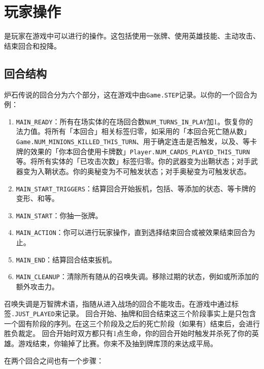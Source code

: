 \chapter{玩家操作}
\label{player-action}

是玩家在游戏中可以进行的操作。这包括使用一张牌、使用英雄技能、主动攻击、结束回合和投降。

\section{回合结构}
炉石传说的回合分为六个部分，这在游戏中由\texttt{Game.STEP}记录。以你的一个回合为例：
\begin{enumerate}
    \item {}\texttt{MAIN\_READY}：所有在场实体的在场回合数\texttt{NUM\_TURNS\_IN\_PLAY}加1。恢复你的法力值。将所有「本回合」相关标签归零，如采用的「本回合死亡随从数」\texttt{Game.NUM\_MINIONS\_KILLED\_THIS\_TURN}、用于确定连击是否触发，以及、等卡牌的效果的「你本回合使用卡牌数」\texttt{Player.NUM\_\allowbreak{}CARDS\_PLAYED\_THIS\_TURN}等。将所有实体的「已攻击次数」标签归零。你的武器变为出鞘状态；对手武器变为入鞘状态。你的奥秘变为不可触发状态；对手奥秘变为可触发状态。
    \item {}\texttt{MAIN\_START\_TRIGGERS}：结算回合开始扳机，包括、等添加的状态、等卡牌的变形、和等。
    \item {}\texttt{MAIN\_START}：你抽一张牌。
    \item {}\texttt{MAIN\_ACTION}：你可以进行玩家操作，直到选择结束回合或被效果结束回合为止。
    \item {}\texttt{MAIN\_END}：结算回合结束扳机。
    \item {}\texttt{MAIN\_CLEANUP}：清除所有随从的召唤失调。移除过期的状态，例如或所添加的额外攻击力。
\end{enumerate}

\notice 召唤失调是万智牌术语，指随从进入战场的回合不能攻击。在游戏中通过标签\texttt{.JUST\_PLAYED}来记录。
\notice 回合开始、抽牌和回合结束这三个阶段事实上是只包含一个固有阶段的序列。在这三个阶段及之后的死亡阶段（如果有）结束后，会进行胜负裁定。
\example 回合开始时双方都只有1点生命，你的回合开始时触发并杀死了你的英雄。游戏结束，你输掉了比赛。你来不及抽到牌库顶的来达成平局。

在两个回合之间也有一个步骤：

